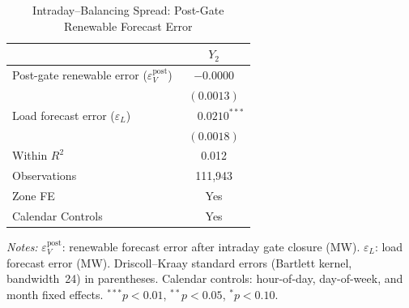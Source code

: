 \documentclass{article}
\begin{document}
\begin{table}[htbp]
\centering
\caption{Intraday--Balancing Spread: Post-Gate Renewable Forecast Error}
\label{tab:r6_y2_timing}
\begin{threeparttable}
\begin{tabularx}{\linewidth}{>{\raggedright\arraybackslash}Xc}
\toprule
 & $Y_2$ \\
\midrule
Post-gate renewable error ($\varepsilon_V^{\mathrm{post}}$) & $-0.0000$ \\
 & $(0.0013)$ \\[0.4ex]
Load forecast error ($\varepsilon_L$) & $\phantom{-}0.0210^{***}$ \\
 & $(0.0018)$ \\
\midrule
Within $R^2$ & 0.012 \\
Observations & 111,943 \\
Zone FE & Yes \\
Calendar Controls & Yes \\
\bottomrule
\end{tabularx}
\begin{tablenotes}[flushleft]
\footnotesize
\item \textit{Notes:} $\varepsilon_V^{\mathrm{post}}$: renewable forecast error after intraday gate closure (MW). $\varepsilon_L$: load forecast error (MW). Driscoll--Kraay standard errors (Bartlett kernel, bandwidth~24) in parentheses. Calendar controls: hour-of-day, day-of-week, and month fixed effects. $^{***}p<0.01$, $^{**}p<0.05$, $^{*}p<0.10$.
\end{tablenotes}
\end{threeparttable}
\end{table}
\end{document}
